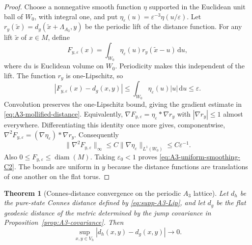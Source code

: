 \documentclass[11pt]{article}
\newtheorem{theorem}{Theorem}[section]
\theoremstyle{definition}
\theoremstyle{remark}
\theoremstyle{definition}
\theoremstyle{remark}
\newcommand{\dd}{\mathrm d}
\begin{document}
\begin{proof}
Choose a nonnegative smooth function $\eta$ supported in the Euclidean
unit ball of $W_0$, with integral one, and put
$\eta_\varepsilon(u)=\varepsilon^{-3}\eta(u/\varepsilon)$.
Let $r_y(\widetilde x)=d_g(\widetilde x+\Lambda_{A_3},y)$ be the periodic
lift of the distance function.  For any lift $\widetilde x$ of $x\in M$,
define
\[
 F_{y,\varepsilon}(x)=\int_{W_0}
       \eta_\varepsilon(u)r_y(\widetilde x-u)\,\dd u,
\]
where $\dd u$ is Euclidean volume on $W_0$.  Periodicity makes this
independent of the lift.  The function $r_y$ is one-Lipschitz, so
\[
 |F_{y,\varepsilon}(x)-d_g(x,y)|
 \le\int_{W_0}\eta_\varepsilon(u)|u|\,\dd u\le\varepsilon.
\]
Convolution preserves the one-Lipschitz bound, giving the gradient
estimate in \eqref{eq:A3-mollified-distance}.  Equivalently,
$\nabla F_{y,\varepsilon}=\eta_\varepsilon*\nabla r_y$ with
$|\nabla r_y|\le1$ almost everywhere.
Differentiating this identity once more gives, componentwise,
$\nabla^2F_{y,\varepsilon}=(\nabla\eta_\varepsilon)*\nabla r_y$.
Consequently
\[
 \|\nabla^2F_{y,\varepsilon}\|_\infty
 \le C\|\nabla\eta_\varepsilon\|_{L^1(W_0)}
 \le C\varepsilon^{-1}.
\]
Also $0\le F_{y,\varepsilon}\le\operatorname{diam}(M)$.
Taking $\varepsilon_0<1$ proves \eqref{eq:A3-uniform-smoothing-C2}.
The bounds are uniform in $y$ because the distance functions are
translations of one another on the flat torus.
\end{proof}

\begin{theorem}[Connes-distance convergence on the periodic $A_3$ lattice]
\label{thm:supp-A3-distance}
Let $d_h$ be the pure-state Connes distance defined by
\eqref{eq:supp-A3-Lip}, and let $d_g$ be the flat geodesic distance of the
metric determined by the jump covariance in
Proposition~\ref{prop:A3-covariance}.  Then
\begin{equation}
 \sup_{x,y\in V_h}|d_h(x,y)-d_g(x,y)|\longrightarrow0.
 \label{eq:supp-A3-distance}
\end{equation}
\end{theorem}
\end{document}
